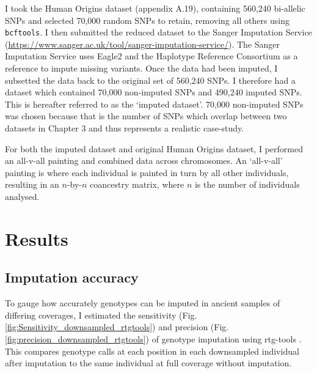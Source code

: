 I took the Human Origins dataset (appendix A.19), containing 560,240 bi-allelic SNPs and selected 70,000 random SNPs to retain, removing all others using \texttt{bcftools}. I then submitted the reduced dataset to the Sanger Imputation Service (\url{https://www.sanger.ac.uk/tool/sanger-imputation-service/}). The Sanger Imputation Service uses Eagle2 \cite{loh2016reference} and the Haplotype Reference Consortium as a reference to impute missing variants. Once the data had been imputed, I subsetted the data back to the original set of 560,240 SNPs. I therefore had a dataset which contained 70,000 non-imputed SNPs and 490,240 imputed SNPs. This is hereafter referred to as the `imputed dataset'. 70,000 non-imputed SNPs was chosen because that is the number of SNPs which overlap between two datasets in Chapter 3 and thus represents a realistic case-study. 

For both the imputed dataset and original Human Origins dataset, I performed an all-v-all painting and combined data across chromosomes. An `all-v-all' painting is where each individual is painted in turn by all other individuals, resulting in an $n$-by-$n$ coancestry matrix, where $n$ is the number of individuals analysed. 


\section{Results}

\subsection{Imputation accuracy}

To gauge how accurately genotypes can be imputed in ancient samples of differing coverages, I estimated the sensitivity (Fig. \ref{fig:Sensitivity_downsampled_rtgtools}) and precision (Fig.  \ref{fig:precision_downsampled_rtgtools}) of genotype imputation using rtg-tools \cite{cleary2014joint}. This compares genotype calls at each position in each downsampled individual after imputation to the same individual at full coverage without imputation.

